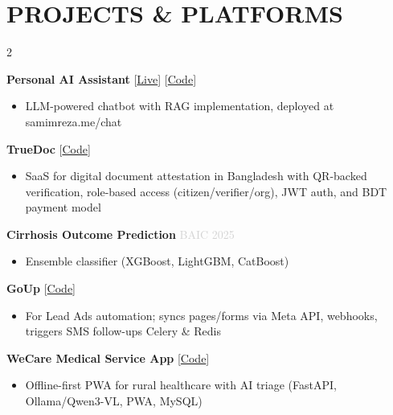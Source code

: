 \documentclass[a4paper,10pt]{article}
\begin{document}
\section*{PROJECTS \& PLATFORMS}
\vspace{-0.2cm}
\begin{multicols}{2}

\textbf{Personal AI Assistant} \hfill [\href{https://samimreza.me/chat}{\color{maincolor}Live}] [\href{https://github.com/samim-reza/MyChatBot}{\color{maincolor}Code}]
\begin{itemize}
    \item LLM-powered chatbot with RAG implementation, deployed at samimreza.me/chat
\end{itemize}

\textbf{TrueDoc} \hfill [\href{https://github.com/samim-reza/TrueDoc}{\color{maincolor}Code}]
\begin{itemize}
    \item SaaS for digital document attestation in Bangladesh with QR-backed verification, role-based access (citizen/verifier/org), JWT auth, and BDT payment model
\end{itemize}

\textbf{Cirrhosis Outcome Prediction} \hfill \textcolor{lightgray}{BAIC 2025}
\begin{itemize}
    \item Ensemble classifier (XGBoost, LightGBM, CatBoost)
\end{itemize}

\columnbreak


\textbf{GoUp} \hfill [\href{https://github.com/samim-reza/GoUp}{\color{maincolor}Code}]
\begin{itemize}
    \item For Lead Ads automation; syncs pages/forms via Meta API, webhooks, triggers SMS follow-ups Celery \& Redis
\end{itemize}

\textbf{WeCare Medical Service App} \hfill [\href{https://github.com/samim-reza/FutureBuilders2025_GreenU_Tensors}{\color{maincolor}Code}]
\begin{itemize}
    \item Offline-first PWA for rural healthcare with AI triage (FastAPI, Ollama/Qwen3-VL, PWA, MySQL)
\end{itemize}


\end{multicols}
\end{document}
